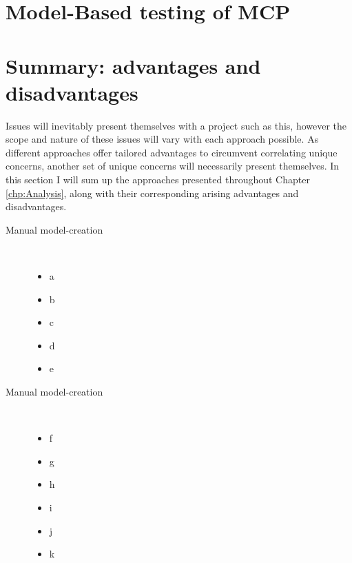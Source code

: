 

% 
% 

\section{Model-Based testing of MCP} %

\section{Summary: advantages and disadvantages} 

Issues will inevitably present themselves with a project such as this, however the scope and nature of these issues will vary with each approach possible. As different approaches offer tailored advantages to circumvent correlating unique concerns, another set of unique concerns will necessarily present themselves. In this section I will sum up the approaches presented throughout Chapter \ref{chp:Analysis}, along with their corresponding arising advantages and disadvantages.
\begin{description}
	\item[Manual model-creation]\ \\
	\begin{itemize}
		\item a
		\item b
		\item c
	\end{itemize}
	\begin{itemize}
		\item d
		\item e
	\end{itemize}
	\item[Manual model-creation]\ \\
	\begin{itemize}
		\item f
		\item g
		\item h
	\end{itemize}
	\begin{itemize}
		\item i
		\item j
		\item k
	\end{itemize}

\end{description}

